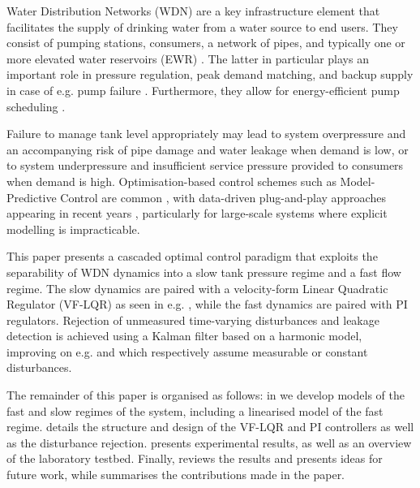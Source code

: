 
Water Distribution Networks (WDN) are a key infrastructure element that facilitates the supply of drinking water from a water source to end users. They consist of pumping stations, consumers, a network of pipes, and typically one or more elevated water reservoirs (EWR) \cite{Swamee2008}. The latter in particular plays an important role in pressure regulation, peak demand matching, and backup supply in case of e.g. pump failure \cite{Creaco2019}. Furthermore, they allow for energy-efficient pump scheduling \cite{Rathore1030,Bello2019}.  

Failure to manage tank level appropriately may lead to system overpressure and an accompanying risk of pipe damage and water leakage when demand is low, or to system underpressure and insufficient service pressure provided to consumers when demand is high. Optimisation-based control schemes such as Model-Predictive Control are common \cite{OcampoMartinez2013,Kallesoe2017}, with data-driven plug-and-play approaches appearing in recent years \cite{Val2020}, particularly for large-scale systems where explicit modelling is impracticable.  

This paper presents a cascaded optimal control paradigm that exploits the separability of WDN dynamics into a slow tank pressure regime and a fast flow regime. The slow dynamics are paired with a velocity-form Linear Quadratic Regulator (VF-LQR) as seen in e.g. \cite{Pannocchia2015a}, while the fast dynamics are paired with PI regulators. Rejection of unmeasured time-varying disturbances and leakage detection is achieved using a Kalman filter based on a harmonic model, improving on e.g. \cite{OcampoMartinez2013} and \cite{Val2020} which respectively assume measurable or constant disturbances.

The remainder of this paper is organised as follows: in  we develop models of the fast and slow regimes of the system, including a linearised model of the fast regime.  details the structure and design of the VF-LQR and PI controllers as well as the disturbance rejection.  presents experimental results, as well as an overview of the laboratory testbed. Finally,  reviews the results and presents ideas for future work, while  summarises the contributions made in the paper.